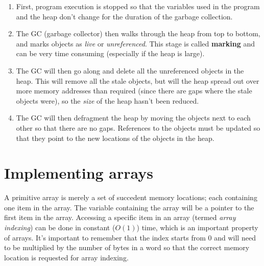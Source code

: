 \begin{enumerate}
	
	\item First, program execution is stopped so that the variables used in
	the program and the heap don't change for the duration of the garbage
	collection.

	\item The GC (garbage collector) then walks through the heap from top to
	bottom, and marks objects as {\it live} or {\it unreferenced}. This stage
	is called {\bf marking} and can be very time consuming (especially if the
	heap is large).

	\item The GC will then go along and delete all the unreferenced objects in
	the heap. This will remove all the stale objects, but will the heap
	spread out over more memory addresses than required (since there are gaps
	where the stale objects were), so the {\it size} of the heap hasn't been
	reduced.

	\item The GC will then defragment the heap by moving the objects next to
	each other so that there are no gaps. References to the objects must be
	updated so that they point to the new locations of the objects in the
	heap.

\end{enumerate}


\section{Implementing arrays}

A primitive array is merely a set of succedent memory locations; each containing
one item in the array. The variable containing the array will be a pointer to
the first item in the array. Accessing a specific item in an array (termed {\it
array indexing}) can be done in constant ($O(1)$) time, which is an important
property of arrays. It's important to remember that the index starts from $0$
and will need to be multiplied by the number of bytes in a word so that the
correct memory location is requested for array indexing.

